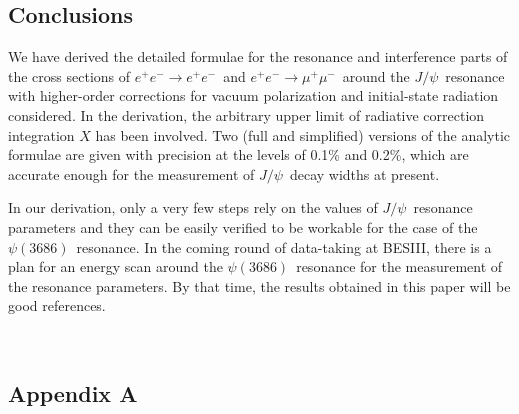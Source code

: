 \documentclass[a4paper,10pt,twoside]{cpc-hepnp}
\newcommand{\jpsi}{$J/\psi$~}
\newcommand{\psip}{$\psi(3686)$~}
\newcommand{\eetoee}{$e^+e^- \to e^+e^-$~}
\newcommand{\eetomumu}{$e^+e^- \to \mu^+\mu^-$~}
\begin{document}
\begin{CJK*}{UTF8}{gbsn}
\begin{multicols}{2}
\section{Conclusions}
%
We have derived the detailed formulae for the resonance and interference parts of the cross sections of \eetoee and \eetomumu around the \jpsi resonance with higher-order corrections for vacuum polarization and initial-state radiation considered. In the derivation, the arbitrary upper limit of radiative correction integration $X$ has been involved. Two (full and simplified) versions of the analytic formulae are given with precision at the levels of 0.1\% and 0.2\%, which are accurate enough for the measurement of \jpsi decay widths at present.

In our derivation, only a very few steps rely on the values of \jpsi resonance parameters and they can be easily verified to be workable for the case of the \psip resonance. In the coming round of data-taking at BESIII, there is a plan for an energy scan around the \psip resonance for the measurement of the resonance parameters. By that time, the results obtained in this paper will be good references.



%
\ \\



\end{multicols}

%
\vspace{15mm}
%
\begin{small}
	\renewcommand{\theequation}{A\arabic{equation}}
	\setcounter{equation}{0}
	\begin{multicols}{2}
		\subsection*{Appendix A}
		\label{Section: Appendix A}
		 \\
		

\end{multicols}
\end{small}
\end{CJK*}
\end{document}
